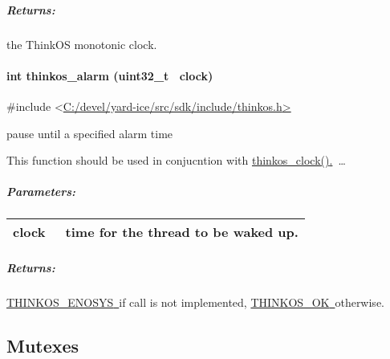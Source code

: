 {\subparagraph{\texorpdfstring{{Returns:}}{Returns:}}\label{returns-9}

{the ThinkOS monotonic clock. }

\paragraph{\texorpdfstring{{int thinkos\_alarm (uint32\_t
~clock)}}{int thinkos\_alarm (uint32\_t ~clock)}}\label{int-thinkos_alarm-uint32_t-clock}

{}

{\#include
\textless{}}{\protect\hyperlink{h.pkwqa1}{C:/devel/yard-ice/src/sdk/include/thinkos.h}}{\protect\hyperlink{h.pkwqa1}{\textgreater{}}}

{pause until a specified alarm time }

{This function should be used in conjucntion with
}{\protect\hyperlink{h.lnxbz9}{thinkos\_clock()}}{\protect\hyperlink{h.lnxbz9}{.}}{~\ldots{}}

\subparagraph{\texorpdfstring{{Parameters:}}{Parameters:}}\label{parameters-8}

\protect\hypertarget{t.281362b1a9b4665596996d7811a599a33fd3578c}{}{}\protect\hypertarget{t.8}{}{}

\begin{longtable}[]{@{}ll@{}}
\toprule
\begin{minipage}[t]{0.47\columnwidth}\raggedright\strut
{clock}{~}\strut
\end{minipage} & \begin{minipage}[t]{0.47\columnwidth}\raggedright\strut
{time for the thread to be waked up. }\strut
\end{minipage}\tabularnewline
\bottomrule
\end{longtable}

\subparagraph{\texorpdfstring{{Returns:}}{Returns:}}\label{returns-10}

{\protect\hyperlink{h.3s49zyc}{THINKOS\_ENOSYS}}{\protect\hyperlink{h.3s49zyc}{~}}{if
call is not implemented,
}{\protect\hyperlink{h.2fk6b3p}{THINKOS\_OK}}{\protect\hyperlink{h.2fk6b3p}{~}}{otherwise.
}

\paragraph{\texorpdfstring{{}}{}}\label{section-1}

\subsection{\texorpdfstring{{Mutexes}}{Mutexes}}\label{mutexes}

}
